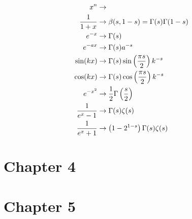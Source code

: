 \begin{align}
    x^n
    &\to
    \\
    \frac{1}{1+x}
    &\to
    \beta(s, 1-s)
    =
    \Gamma(s) \Gamma(1-s)
    \\
    e^{-x}
    &\to
    \Gamma(s)
    \\
    e^{-a x}
    &\to
    \Gamma(s) a^{-s}
    \\
    \sin(k x)
    &\to
    \Gamma(s) \sin\left(\frac{\pi s}{2}\right) k^{-s}
    \\
    \cos(k x)
    &\to
    \Gamma(s) \cos\left(\frac{\pi s}{2}\right) k^{-s}
    \\
    e^{-x^2}
    &\to
    \frac{1}{2}\Gamma\left(\frac{s}{2}\right)
    \\
    \frac{1}{e^{x} - 1}
    &\to
    \Gamma(s)\zeta(s)
    \\
    \frac{1}{e^{x} + 1}
    &\to
    \left(1 - 2^{1-s}\right)\Gamma(s)\zeta(s)
\end{align}


\section*{Chapter 4}


\section*{Chapter 5}

